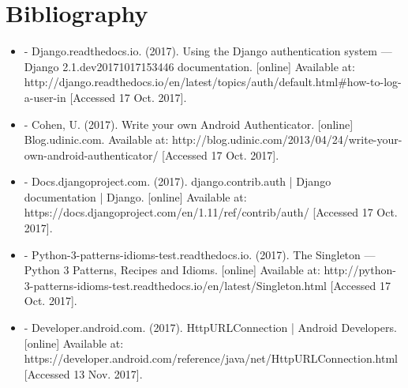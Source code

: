 ﻿\documentclass{article}
\begin{document}
\section{Bibliography}
\begin{itemize}
    \item -  Django.readthedocs.io. (2017). Using the Django authentication system — Django 2.1.dev20171017153446 documentation. [online] Available at: http://django.readthedocs.io/en/latest/topics/auth/default.html#how-to-log-a-user-in [Accessed 17 Oct. 2017].
    \item -  Cohen, U. (2017). Write your own Android Authenticator. [online] Blog.udinic.com. Available at: http://blog.udinic.com/2013/04/24/write-your-own-android-authenticator/ [Accessed 17 Oct. 2017].
    \item - Docs.djangoproject.com. (2017). django.contrib.auth | Django documentation | Django. [online] Available at: https://docs.djangoproject.com/en/1.11/ref/contrib/auth/ [Accessed 17 Oct. 2017].
    \item - Python-3-patterns-idioms-test.readthedocs.io. (2017). The Singleton — Python 3 Patterns, Recipes and Idioms. [online] Available at: http://python-3-patterns-idioms-test.readthedocs.io/en/latest/Singleton.html [Accessed 17 Oct. 2017].
    \item - Developer.android.com. (2017). HttpURLConnection | Android Developers. [online] Available at: https://developer.android.com/reference/java/net/HttpURLConnection.html [Accessed 13 Nov. 2017].
\end{itemize}




\end{document}
